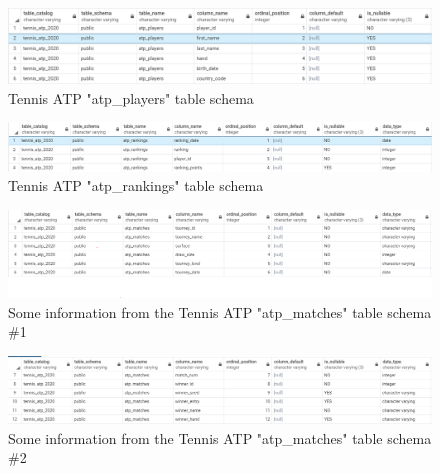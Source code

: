 \begin{figure}[H]
	\includegraphics[width=\linewidth]{./Figures/Appendices/tennis_atp_players_schema.png}
	\caption{Tennis ATP "atp\_players" table schema}
\end{figure}
\begin{figure}[H]
	\includegraphics[width=\linewidth]{./Figures/Appendices/tennis_atp_rankings_schema.png}
	\caption{Tennis ATP "atp\_rankings" table schema}
\end{figure}
\begin{figure}[H]
	\includegraphics[width=\linewidth]{./Figures/Appendices/tennis_atp_matches_schema_1.png}
	\caption{Some information from the Tennis ATP "atp\_matches" table schema \#1}
\end{figure}
\begin{figure}[H]
	\includegraphics[width=\linewidth]{./Figures/Appendices/tennis_atp_matches_schema_2.png}
	\caption{Some information from the Tennis ATP "atp\_matches" table schema \#2}
\end{figure}